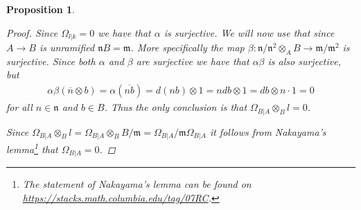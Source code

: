 \documentclass[11pt, a4paper, english]{article}
\newtheorem{prop}{Proposition}
\numberwithin{prop}{section}
\numberwithin{lemma}{section}
\numberwithin{theorem}{section}
\numberwithin{defin}{section}
\numberwithin{example}{section}
\begin{document}
\begin{prop}
\begin{proof}
Since $\Omega_{l|k}=0$ we have that $\alpha$ is surjective. We will now use that since $A \to B$ is unramified $\mathfrak{n}B = \mathfrak{m}$. More specifically the map $\beta: \mathfrak{n}/\mathfrak{n}^2 \otimes_A B \to \mathfrak{m}/\mathfrak{m}^2$ is surjective. Since both $\alpha$ and $\beta$ are surjective we have that $\alpha\beta$ is also surjective, but 
\begin{align*}
\alpha\beta(\overline{n} \otimes b) = \alpha(\overline{nb}) = d(nb) \otimes 1 = ndb \otimes 1 = db \otimes n \cdot 1 = 0
\end{align*}
for all $n \in \mathfrak{n}$ and $b \in B$. Thus the only conclusion is that $\Omega_{B|A} \otimes_B l = 0$.

Since $\Omega_{B|A} \otimes_B l = \Omega_{B|A} \otimes_B B/\mathfrak{m} = \Omega_{B|A}/\mathfrak{m}\Omega_{B|A}$ it follows from Nakayama's lemma\footnote{The statement of Nakayama's lemma can be found on \href{https://stacks.math.columbia.edu/tag/07RC}{https://stacks.math.columbia.edu/tag/07RC}.} that $\Omega_{B|A}=0$.
\end{proof}
\end{prop}
\end{document}
